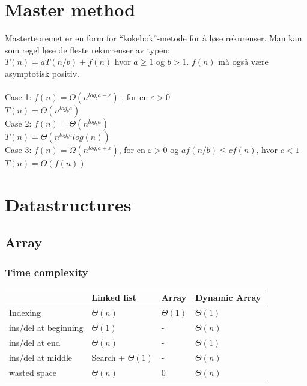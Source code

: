 \documentclass[a4paper, 10pt]{article}
\begin{document}
\newpage


\section{Master method}

Masterteoremet er en form for ``kokebok''-metode for å løse rekurenser. Man kan som regel løse de fleste rekurrenser av typen: \\

\noindent $T(n) = aT(n/b) + f(n)$ hvor $a \ge 1$ og $b > 1$. $f(n)$ må også være asymptotisk positiv. \\ \hfill
\\ \hfill
Case 1: $f(n) = O(n^{log_{b}a - \varepsilon})$ , for en $\varepsilon > 0$ \\ \indent \indent \Rightarrow $T(n) = \Theta(n^{log_{b}a})$ \\
Case 2: $f(n) = \Theta(n^{log_{b}a})$  \\ \indent \indent \Rightarrow $T(n) = \Theta(n^{log_{b}a} log(n))$ \\
Case 3: $f(n) = \Omega(n^{log_{b}a + \varepsilon})$, for en $\varepsilon > 0$ og $af(n/b) \leq cf(n)$, hvor $c < 1$ \\ \indent \indent \Rightarrow $T(n) = \Theta(f(n))$

\newpage


\section{Datastructures}
\subsection{Array}
\subsubsection{Time complexity}
    \begin{tabular}{|l|l|l|l|}
    \hline
                        & Linked list       & Array    & Dynamic Array \\ \hline
    Indexing             & $\Theta(n)$          & $\Theta(1)$ & $\Theta(1)$      \\ \hline
    ins/del at beginning & $\Theta(1)$          & -        & $\Theta(n)$      \\ \hline
    ins/del at end       & $\Theta(n)$          & -        & $\Theta(1)$      \\ \hline
    ins/del at middle    & Search + $\Theta(1)$ & -        & $\Theta(n)$      \\ \hline
    wasted space         & $\Theta(n)$          & $0$        & $\Theta(n)$      \\ \hline
    \end{tabular}
\end{document}

